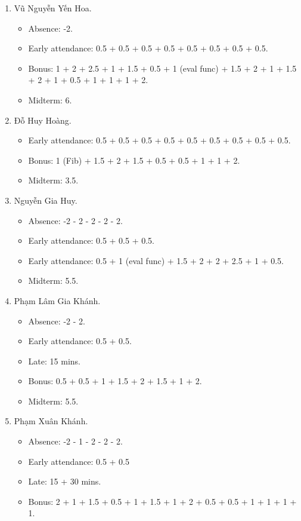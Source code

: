 \documentclass{article}
\begin{document}
\begin{enumerate}
\begin{itemize}
	\end{itemize}
	\item {\sc Vũ Nguyễn Yến Hoa.}
	\begin{itemize}
        \item Absence: -2.
		\item Early attendance: 0.5 + 0.5 + 0.5 + 0.5 + 0.5 + 0.5 + 0.5 + 0.5.
		\item Bonus: 1 + 2 + 2.5 + 1 + 1.5 + 0.5 + 1 (eval func) + 1.5 + 2 + 1 + 1.5 + 2 + 1 + 0.5 + 1 + 1 + 1 + 2.
        \item Midterm: 6.
	\end{itemize}
	\item {\sc Đỗ Huy Hoàng.}
	\begin{itemize}
		\item Early attendance: 0.5 + 0.5 + 0.5 + 0.5 + 0.5 + 0.5 + 0.5 + 0.5 + 0.5.
		\item Bonus: 1 (Fib) + 1.5 + 2 + 1.5 + 0.5 + 0.5 + 1 + 1 + 2.
        \item Midterm: 3.5.
	\end{itemize}
	\item {\sc Nguyễn Gia Huy.}
	\begin{itemize}
		\item Absence: -2 - 2 - 2 - 2 - 2.
        \item Early attendance: 0.5 + 0.5 + 0.5.
		\item Early attendance: 0.5 + 1 (eval func) + 1.5 + 2 + 2 + 2.5 + 1 + 0.5.
        \item Midterm: 5.5.
	\end{itemize}
	\item {\sc Phạm Lâm Gia Khánh.}
	\begin{itemize}
		\item Absence: -2 - 2.
        \item Early attendance: 0.5 + 0.5.
		\item Late: 15 mins.
		\item Bonus: 0.5 + 0.5 + 1 + 1.5 + 2 + 1.5 + 1 + 2.
        \item Midterm: 5.5.
	\end{itemize}
	\item {\sc Phạm Xuân Khánh.}
	\begin{itemize}
		\item Absence: -2 - 1 - 2 - 2 - 2.
		\item Early attendance: 0.5 + 0.5
		\item Late: 15 + 30 mins.
		\item Bonus: 2 + 1 + 1.5 + 0.5 + 1 + 1.5 + 1 + 2 + 0.5 + 0.5 + 1 + 1 + 1 + 1.

\end{itemize}
\end{enumerate}
\end{document}
